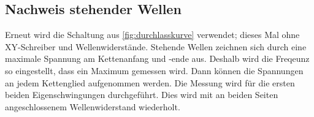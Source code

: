\subsection{Nachweis stehender Wellen}
Erneut wird die Schaltung aus \ref{fig:durchlasskurve} verwendet; dieses Mal ohne XY-Schreiber und Wellenwiderstände. Stehende Wellen zeichnen sich durch eine maximale Spannung am Kettenanfang und -ende aus. Deshalb wird die Freqeunz so eingestellt, dass ein Maximum gemessen wird. Dann können die Spannungen an jedem Kettenglied aufgenommen werden. Die Messung wird für die ersten beiden Eigenschwingungen durchgeführt.
Dies wird mit an beiden Seiten angeschlossenem Wellenwiderstand wiederholt.
